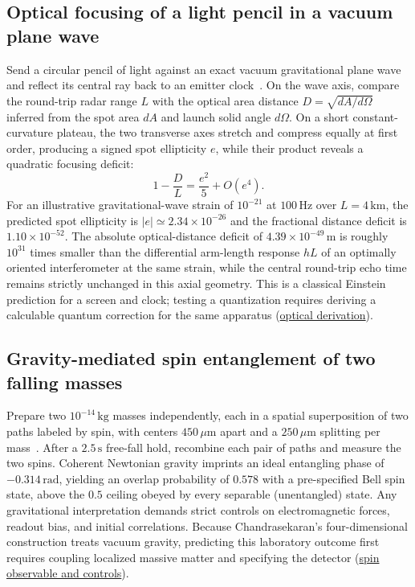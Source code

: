 \documentclass[10pt,a4paper]{article}
\newcommand{\repo}[2]{\href{https://github.com/sprajs/quantum-gravity/blob/main/#1}{#2}}
\begin{document}
\subsection{Optical focusing of a light pencil in a vacuum plane wave}
Send a circular pencil of light against an exact vacuum gravitational plane wave and reflect its central ray back to an emitter clock~\cite{harte2015}. On the wave axis, compare the round-trip radar range $L$ with the optical area distance $D = \sqrt{dA/d\Omega}$ inferred from the spot area $dA$ and launch solid angle $d\Omega$. On a short constant-curvature plateau, the two transverse axes stretch and compress equally at first order, producing a signed spot ellipticity $e$, while their product reveals a quadratic focusing deficit:
\begin{equation}
  1 - \frac{D}{L} = \frac{e^2}{5} + O(e^4).
\end{equation}
For an illustrative gravitational-wave strain of $10^{-21}$ at $100\,\mathrm{Hz}$ over $L = 4\,\mathrm{km}$, the predicted spot ellipticity is $|e| \simeq 2.34\times 10^{-26}$ and the fractional distance deficit is $1.10\times 10^{-52}$. The absolute optical-distance deficit of $4.39\times 10^{-49}\,\mathrm{m}$ is roughly $10^{31}$ times smaller than the differential arm-length response $hL$ of an optimally oriented interferometer at the same strain, while the central round-trip echo time remains strictly unchanged in this axial geometry. This is a classical Einstein prediction for a screen and clock; testing a quantization requires deriving a calculable quantum correction for the same apparatus (\repo{audit/observable-optics.md}{optical derivation}).

\subsection{Gravity-mediated spin entanglement of two falling masses}
Prepare two $10^{-14}\,\mathrm{kg}$ masses independently, each in a spatial superposition of two paths labeled by spin, with centers $450\,\mu\mathrm{m}$ apart and a $250\,\mu\mathrm{m}$ splitting per mass~\cite{bose2017,marletto2017}. After a $2.5\,\mathrm{s}$ free-fall hold, recombine each pair of paths and measure the two spins. Coherent Newtonian gravity imprints an ideal entangling phase of $-0.314\,\mathrm{rad}$, yielding an overlap probability of $0.578$ with a pre-specified Bell spin state, above the $0.5$ ceiling obeyed by every separable (unentangled) state. Any gravitational interpretation demands strict controls on electromagnetic forces, readout bias, and initial correlations. Because Chandrasekaran's four-dimensional construction treats vacuum gravity, predicting this laboratory outcome first requires coupling localized massive matter and specifying the detector (\repo{audit/observable-lab.md}{spin observable and controls}).
\end{document}
